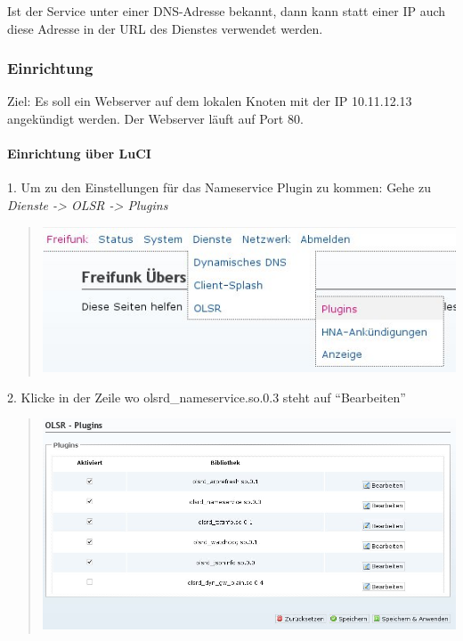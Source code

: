 \documentclass[a4paper,12pt,ngerman]{sphinxmanual}
\begin{document}
Ist der Service unter einer DNS-Adresse bekannt, dann kann statt einer IP auch
diese Adresse in der URL des Dienstes verwendet werden.


\subsubsection{Einrichtung}
\label{advanced/nameservice:einrichtung}
Ziel: Es soll ein Webserver auf dem lokalen Knoten mit der IP
10.11.12.13 angekündigt werden. Der Webserver läuft auf Port 80.


\paragraph{Einrichtung über LuCI}
\label{advanced/nameservice:einrichtung-uber-luci}
1. Um zu den Einstellungen für das Nameservice Plugin zu kommen: Gehe zu \emph{Dienste -\textgreater{} OLSR -\textgreater{} Plugins}
\begin{quote}

\includegraphics{nameservice-menu.jpg}
\end{quote}

2. Klicke in der Zeile wo olsrd\_nameservice.so.0.3 steht auf ``Bearbeiten''
\begin{quote}

\includegraphics{nameservice-olsr-plugins.jpg}
\end{quote}
\end{document}
